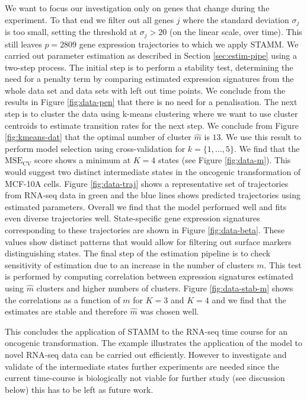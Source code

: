 We want to focus our investigation only on genes that change during the experiment. To that end we filter out all genes $j$ where the standard deviation $\sigma_j$ is too small, setting the threshold at $\sigma_j > 20$ (on the linear scale, over time). This still leaves $p=2809$ gene expression trajectories to which we apply STAMM. We carried out parameter estimation as described in Section \ref{sec:estim-pipe} using a two-step process. The initial step is to perform a stability test, determining the need for a penalty term by comparing estimated expression signatures from the whole data set and data sets with left out time points. We conclude from the results in Figure \ref{fig:data-pen} that there is no need for a penalisation. The next step is to cluster the data using k-means clustering where we want to use cluster centroids to estimate transition rates for the next step. We conclude from Figure \ref{fig:kmeans-dat} that the optimal number of cluster  $\hat{m}$ is $13$. We use this result to perform model selection using cross-validation for $k=\lbrace 1, \ldots, 5\rbrace$. We find that the $\mathrm{MSE_{CV}}$ score shows a minimum at $K=4$ states (see Figure \ref{fig:data-m}). This would suggest two distinct intermediate states in the oncogenic transformation of MCF-10A cells. Figure \ref{fig:data-traj} shows a representative set of trajectories from RNA-seq data in green and the blue lines shows predicted trajectories using estimated parameters. Overall we find that the model performed well and fits even diverse trajectories well. State-specific gene expression signatures corresponding to these trajectories are shown in Figure \ref{fig:data-beta}. These values show distinct patterns that would allow for filtering out surface markers distinguishing states. The final step of the estimation pipeline is to check sensitivity of estimation due to an increase in the number of clusters $m$. This test is performed by computing correlation between expression signatures estimated using $\hat{m}$ clusters and higher numbers of clusters. Figure \ref{fig:data-stab-m} shows the correlations as a function of $m$ for $K=3$ and $K=4$ and we find that the estimates are stable and therefore $\hat{m}$ was chosen well.

This concludes the application of STAMM to the RNA-seq time course for an oncogenic transformation. The example illustrates the application of the model to novel RNA-seq data can be carried out efficiently. However to investigate and validate of the intermediate states further experiments are needed since the current time-course is biologically not viable for further study (see discussion below) this has to be left as future work. 

